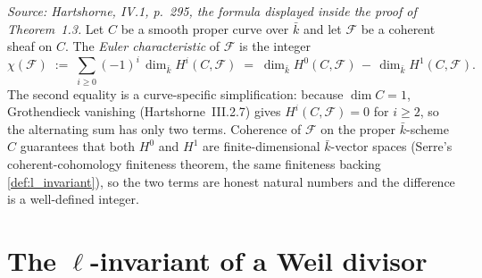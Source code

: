 \begin{definition}


  \label{def:eulerChar_curve}

  \textit{Source: Hartshorne, IV.1, p.~295, the formula displayed
  inside the proof of Theorem~1.3.}
  Let \(C\) be a smooth proper curve over \(\bar k\) and let \(\mathcal F\)
  be a coherent sheaf on \(C\). The \emph{Euler characteristic} of
  \(\mathcal F\) is the integer
  \[
    \chi(\mathcal F) \;:=\;
    \sum_{i \geq 0} (-1)^i \,\dim_{\bar k} H^i(C, \mathcal F)
    \;=\;
    \dim_{\bar k} H^0(C, \mathcal F)
    \,-\,
    \dim_{\bar k} H^1(C, \mathcal F).
  \]
  The second equality is a curve-specific simplification: because
  \(\dim C = 1\), Grothendieck vanishing (Hartshorne~III.2.7) gives
  \(H^i(C, \mathcal F) = 0\) for \(i \geq 2\), so the alternating sum has
  only two terms. Coherence of \(\mathcal F\) on the proper $\bar
  k$-scheme $C$ guarantees that both $H^0$ and $H^1$ are
  finite-dimensional \(\bar k\)-vector spaces (Serre's coherent-cohomology
  finiteness theorem, the same finiteness backing
  \cref{def:l_invariant}), so the two terms are honest natural numbers and
  the difference is a well-defined integer.

\end{definition}

\section{The \(\ell\)-invariant of a Weil divisor}


